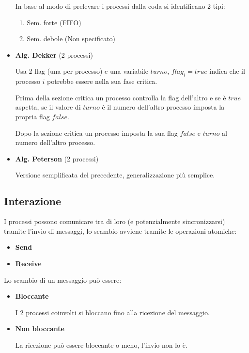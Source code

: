 \documentclass{article}
\begin{document}
\begin{itemize}
        In base al modo di prelevare i processi dalla coda si identificano 2 tipi:
        \begin{enumerate}
            \item Sem. forte (FIFO)
            \item Sem. debole (Non specificato)
        \end{enumerate}

    \item \textbf{Alg. Dekker} (2 processi)

        Usa 2 flag (una per processo) e una variabile $turno$, $flag_i=true$ indica che il processo $i$ potrebbe essere nella sua fase critica. 

        \vspace{6pt}
        
        Prima della sezione critica un processo controlla la flag dell'altro e se è $true$ aspetta, se il valore di $turno$ è il numero dell'altro processo imposta la propria flag $false$. 

        \vspace{6pt}
        
        Dopo la sezione critica un processo imposta la sua flag $false$ e $turno$ al numero dell'altro processo.

    \item \textbf{Alg. Peterson} (2 processi)

        Versione semplificata del precedente, generalizzazione più semplice.
    
\end{itemize}

\subsection{Interazione}

I processi possono comunicare tra di loro (e potenzialmente sincronizzarsi) tramite l'invio di messaggi, lo scambio avviene tramite le operazioni atomiche:
\begin{itemize}
    \item \textbf{Send}
    \item \textbf{Receive}
\end{itemize}

\noindent Lo scambio di un messaggio può essere:
\begin{itemize}
    \item \textbf{Bloccante} 

        I 2 processi coinvolti si bloccano fino alla ricezione del messaggio.

    \item \textbf{Non bloccante}

        La ricezione può essere bloccante o meno, l'invio non lo è.\newline 
    
\end{itemize}
\end{document}
